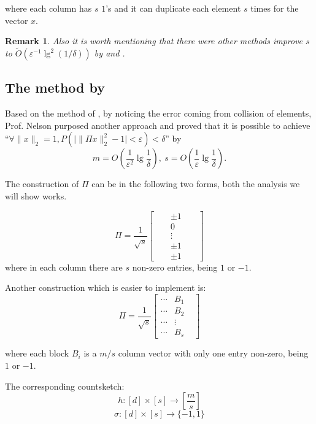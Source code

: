 \documentclass[11pt]{article}
\newtheorem{remark}{Remark}
\begin{document}
where each column has $s$ $1$'s and it can duplicate each element $s$ times for the vector $x$.
\begin{remark}
Also it is worth mentioning that there were other methods improve $s$ to $\tilde{O}(\varepsilon^{-1} \lg^2(1/\delta))$ by \cite{kane2010derandomized} and \cite{braverman2010rademacher}.
\end{remark}





\subsection{The method by \cite{kane2014sparser}}

Based on the method of \cite{kane2014sparser}, by noticing the error coming from collision of elements, Prof. Nelson purposed another approach and  proved that it is possible to achieve ``$\forall \|x\|_2=1,P(\big|\|\Pi x\|^2_2-1\big|<\varepsilon)<\delta$'' by 
$$m=O(\frac{1}{\varepsilon^2}\lg\frac{1}{\delta}),~s=O(\frac{1}{\varepsilon}\lg\frac{1}{\delta}).$$

The construction of $\Pi$ can be in the following two forms, both the analysis we will show works.

$$\Pi=\frac{1}{\sqrt{s}}\begin{bmatrix}
 &  & \pm 1 &  & \\ 
 &  & 0 &  & \\ 
 &  &\vdots  &  & \\ 
 &  & \pm 1 &  & \\ 
 &  & \pm 1 &  & 
\end{bmatrix}$$
where in each column there are $s$ non-zero entries, being $1$ or $-1$.

Another construction which is easier to implement is:
\[
\Pi=\frac{1}{\sqrt{s}}
\left[
\begin{array}{c|c|c}

\cdots & B_1& \\\hline
 \cdots & B_2&\\
\hline
\cdots & \vdots&\\
\hline

\cdots & B_{s}&
\end{array}
\right]
\]

where each block $B_i$ is a $m/s$ column vector with only one entry non-zero, being $1$ or $-1$.

The corresponding countsketch: 
$$h:[d]\times[s]\rightarrow[\frac{m}{s}]$$
$$\sigma:[d]\times[s]\rightarrow\{-1,1\}$$
\end{document}
